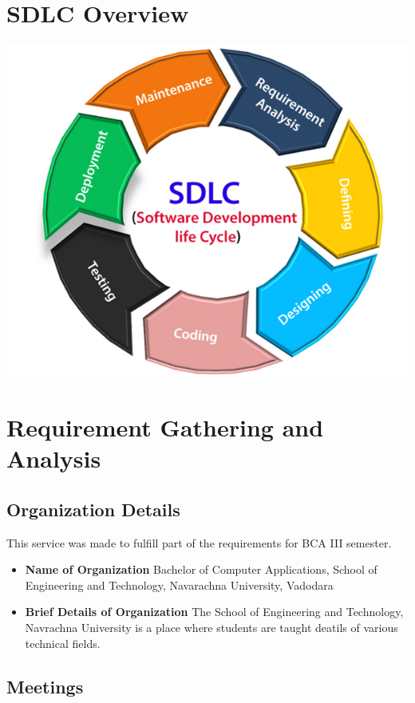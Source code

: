 \documentclass[12pt,a4paper]{report}
\begin{document}
\chapter{SDLC Overview}\label{cha:sdlc_overview}
\includegraphics{se-sdlc.png}
\newpage
\chapter{Requirement Gathering and Analysis}\label{sec:requirement_gathering_and_analysis}
\section{Organization Details}\label{sec:organization_details}

This service was made to fulfill part of the requirements for BCA III semester.

\begin{itemize}
	\item \textbf{Name of Organization}
	      Bachelor of Computer Applications, School of Engineering and Technology, Navarachna University, Vadodara

	\item \textbf{Brief Details of Organization}
	      The School of Engineering and Technology, Navrachna University is a place where students are taught deatils of various technical fields.
\end{itemize}

\section{Meetings}\label{sec:meetings}
\end{document}
